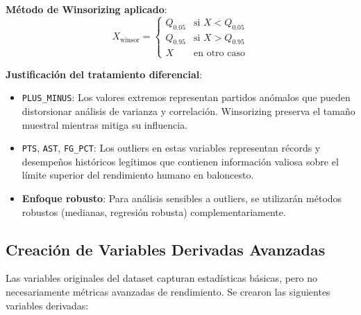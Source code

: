 \documentclass[12pt]{article}
\begin{document}
\textbf{Método de Winsorizing aplicado}:
\[
X_{\text{winsor}} = \begin{cases}
Q_{0.05} & \text{si } X < Q_{0.05} \\
Q_{0.95} & \text{si } X > Q_{0.95} \\
X & \text{en otro caso}
\end{cases}
\]

\textbf{Justificación del tratamiento diferencial}:
\begin{itemize}
\item \texttt{PLUS\_MINUS}: Los valores extremos representan partidos anómalos que pueden distorsionar análisis de varianza y correlación. Winsorizing preserva el tamaño muestral mientras mitiga su influencia.

\item \texttt{PTS}, \texttt{AST}, \texttt{FG\_PCT}: Los outliers en estas variables representan récords y desempeños históricos legítimos que contienen información valiosa sobre el límite superior del rendimiento humano en baloncesto.

\item \textbf{Enfoque robusto}: Para análisis sensibles a outliers, se utilizarán métodos robustos (medianas, regresión robusta) complementariamente.
\end{itemize}

\subsection{Creación de Variables Derivadas Avanzadas}
\label{subsec:variables-derivadas}

Las variables originales del dataset capturan estadísticas básicas, pero no necesariamente métricas avanzadas de rendimiento. Se crearon las siguientes variables derivadas:
\end{document}
